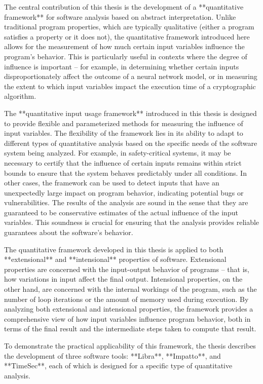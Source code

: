 {The central contribution of this thesis is the development of a **quantitative framework** for software analysis based on abstract interpretation. Unlike traditional program properties, which are typically qualitative (either a program satisfies a property or it does not), the quantitative framework introduced here allows for the measurement of how much certain input variables influence the program’s behavior. This is particularly useful in contexts where the degree of influence is important -- for example, in determining whether certain inputs disproportionately affect the outcome of a neural network model, or in measuring the extent to which input variables impact the execution time of a cryptographic algorithm.

The **quantitative input usage framework** introduced in this thesis is designed to provide flexible and parameterized methods for measuring the influence of input variables. The flexibility of the framework lies in its ability to adapt to different types of quantitative analysis based on the specific needs of the software system being analyzed. For example, in safety-critical systems, it may be necessary to certify that the influence of certain inputs remains within strict bounds to ensure that the system behaves predictably under all conditions. In other cases, the framework can be used to detect inputs that have an unexpectedly large impact on program behavior, indicating potential bugs or vulnerabilities. The results of the analysis are sound in the sense that they are guaranteed to be conservative estimates of the actual influence of the input variables. This soundness is crucial for ensuring that the analysis provides reliable guarantees about the software’s behavior.

The quantitative framework developed in this thesis is applied to both **extensional** and **intensional** properties of software. Extensional properties are concerned with the input-output behavior of programs -- that is, how variations in input affect the final output. Intensional properties, on the other hand, are concerned with the internal workings of the program, such as the number of loop iterations or the amount of memory used during execution. By analyzing both extensional and intensional properties, the framework provides a comprehensive view of how input variables influence program behavior, both in terms of the final result and the intermediate steps taken to compute that result.

To demonstrate the practical applicability of this framework, the thesis describes the development of three software tools: **Libra**, **Impatto**, and **TimeSec**, each of which is designed for a specific type of quantitative analysis.

}
